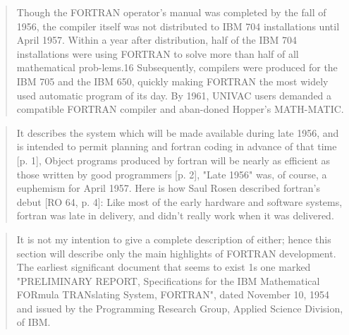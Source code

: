 \begin{quotation}
Though the FORTRAN operator's manual was completed by the fall of 1956, the 
compiler itself was not distributed to IBM 704 installations until April 1957. 
Within a year after distribution, half of the IBM 704 installations were using 
FORTRAN to solve more than half of all mathematical prob-lems.16 Subsequently, 
compilers were produced for the IBM 705 and the IBM 650, quickly making FORTRAN 
the most widely used automatic program of its day. By 1961, UNIVAC users 
demanded a compatible FORTRAN compiler and aban-doned Hopper's MATH-MATIC.
\cite{grace_hopper_and_the_invention_of_the_information_age_2009}
\end{quotation}

\begin{quotation}
It describes the system which will be made available during late 1956, and is 
intended to permit planning and fortran coding in advance of that time [p. 1], 
Object programs produced by fortran will be nearly as efficient as those 
written by good programmers [p. 2], "Late 1956" was, of course, a euphemism for 
April 1957. Here is how Saul Rosen described fortran's debut [RO 64, p. 4]: Like 
most of the early hardware and software systems, fortran was late in delivery, 
and didn't really work when it was delivered.
\cite{history_of_computing_in_the_twentieth_century_1980}
\end{quotation}

\begin{quotation}
It is not my intention to give a complete description of either; hence this 
section will describe only the main highlights of FORTRAN development. The 
earliest significant document that seems to exist 1s one marked
"PRELIMINARY REPORT, Specifications for the IBM Mathematical FORmula 
TRANslating System, FORTRAN", dated November 10, 1954 and issued by the 
Programming Research Group, Applied Science Division, of IBM. 
\cite{sammet_programming_languages_history_and_fundamentals_1969}
\end{quotation}


